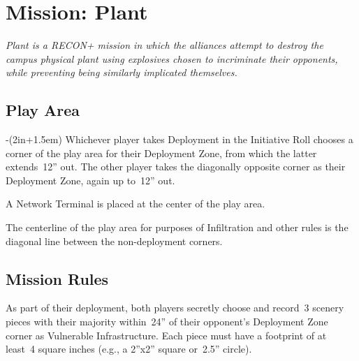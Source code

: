 \chapter{Mission: Plant}


\emph{\emph{Plant} is a RECON+ mission in which the alliances attempt
  to destroy the campus physical plant using explosives chosen to
  incriminate their opponents, while preventing being similarly
  implicated themselves.}

\section{Play Area}
\vspace{-2\parskip}
\noindent\begin{stdminipage}{\linewidth-(2in+1.5em)}
\vspace{0pt}   
\noindent
Whichever player takes Deployment in the Initiative Roll chooses a
corner of the play area for their Deployment Zone, from which the
latter extends~12'' out.  The other player takes the diagonally
opposite corner as their Deployment Zone, again up to~12'' out.

A Network Terminal is placed at the center of the play area.

The centerline of the play area for purposes of Infiltration and other
rules is the diagonal line between the non-deployment corners.

\section{Mission Rules}
As part of their deployment, both players secretly choose and record~3
scenery pieces with their majority within~24'' of their opponent's
Deployment Zone corner as Vulnerable Infrastructure.  Each piece must
have a footprint of at least~4 square inches (e.g., a 2''x2'' square
or~2.5'' circle).

\end{stdminipage}
\hfill
